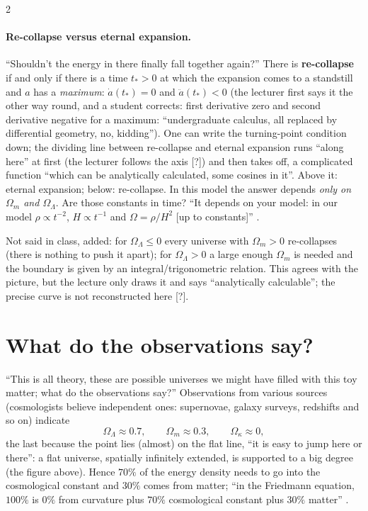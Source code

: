 \begin{paracol}{2}
\paragraph{Re-collapse versus eternal expansion.} ``Shouldn't the energy in there finally fall together again?'' There is \textbf{re-collapse} if and only if there is a time $t_*>0$ at which the expansion comes to a standstill and $a$ has a \emph{maximum}: $\dot a(t_*)=0$ and $\ddot a(t_*)<0$ (the lecturer first says it the other way round, and a student corrects: first derivative zero and second derivative negative for a maximum: ``undergraduate calculus, all replaced by differential geometry, no, kidding''). One can write the turning-point condition down; the dividing line between re-collapse and eternal expansion runs ``along here'' at first (the lecturer follows the axis [?]) and then takes off, a complicated function ``which can be analytically calculated, some cosines in it''. Above it: eternal expansion; below: re-collapse. In this model the answer depends \emph{only on $\Omega_m$ and $\Omega_\Lambda$}. Are those constants in time? ``It depends on your model: in our model $\rho\propto t^{-2}$, $H\propto t^{-1}$ and $\Omega=\rho/H^2$ [up to constants]'' .

\begin{coursenote}
Not said in class, added: for $\Omega_\Lambda\le0$ every universe with $\Omega_m>0$ re-collapses (there is nothing to push it apart); for $\Omega_\Lambda>0$ a large enough $\Omega_m$ is needed and the boundary is given by an integral/trigonometric relation. This agrees with the picture, but the lecture only draws it and says ``analytically calculable''; the precise curve is not reconstructed here [?].
\end{coursenote}

\section{What do the observations say?}\label{sec:c21-obs}

``This is all theory, these are possible universes we might have filled with this toy matter; what do the observations say?'' Observations from various sources (cosmologists believe independent ones: supernovae, galaxy surveys, redshifts and so on) indicate
\[
  \Omega_\Lambda\approx0.7,\qquad\Omega_m\approx0.3,\qquad\Omega_\kappa\approx0,
\]
the last because the point lies (almost) on the flat line, ``it is easy to jump here or there'': a flat universe, spatially infinitely extended, is supported to a big degree (the figure above). Hence $70\%$ of the energy density needs to go into the cosmological constant and $30\%$ comes from matter; ``in the Friedmann equation, $100\%$ is $0\%$ from curvature plus $70\%$ cosmological constant plus $30\%$ matter'' .


\end{paracol}
